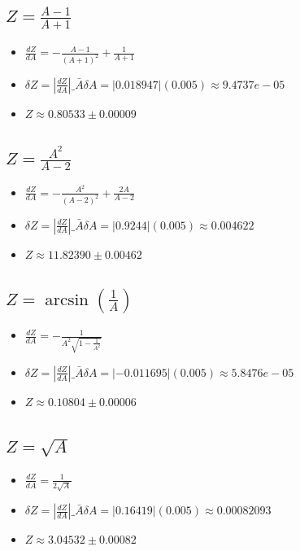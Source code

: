 \documentclass[12pt]{exam}
\begin{document}
\subsection{$Z = \frac{A-1}{A+1}$}
\begin{itemize}
\item $\frac{dZ}{dA} = - \frac{A - 1}{\left(A + 1\right)^{2}} + \frac{1}{A + 1}$
\item $\delta Z = \left|\frac{dZ}{dA}\right|\_{\bar{A}} \delta A = |0.018947|(0.005) \approx 9.4737e-05$
\item $Z \approx 0.80533 \pm 0.00009$
\end{itemize}
\vspace{0.5cm}

\subsection{$Z = \frac{A^2}{A-2}$}
\begin{itemize}
\item $\frac{dZ}{dA} = - \frac{A^{2}}{\left(A - 2\right)^{2}} + \frac{2 A}{A - 2}$
\item $\delta Z = \left|\frac{dZ}{dA}\right|\_{\bar{A}} \delta A = |0.9244|(0.005) \approx 0.004622$
\item $Z \approx 11.82390 \pm 0.00462$
\end{itemize}
\vspace{0.5cm}

\subsection{$Z = \arcsin(\frac{1}{A})$}
\begin{itemize}
\item $\frac{dZ}{dA} = - \frac{1}{A^{2} \sqrt{1 - \frac{1}{A^{2}}}}$
\item $\delta Z = \left|\frac{dZ}{dA}\right|\_{\bar{A}} \delta A = |-0.011695|(0.005) \approx 5.8476e-05$
\item $Z \approx 0.10804 \pm 0.00006$
\end{itemize}
\vspace{0.5cm}

\subsection{$Z = \sqrt{A}$}
\begin{itemize}
\item $\frac{dZ}{dA} = \frac{1}{2 \sqrt{A}}$
\item $\delta Z = \left|\frac{dZ}{dA}\right|\_{\bar{A}} \delta A = |0.16419|(0.005) \approx 0.00082093$
\item $Z \approx 3.04532 \pm 0.00082$
\end{itemize}
\vspace{0.5cm}
\end{document}
